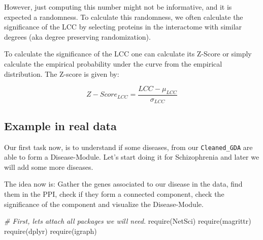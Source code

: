 \documentclass[
]{book}
\newenvironment{Shaded}{\begin{snugshade}}{\end{snugshade}}
\newcommand{\CommentTok}[1]{\textcolor[rgb]{0.56,0.35,0.01}{\textit{#1}}}
\newcommand{\FunctionTok}[1]{\textcolor[rgb]{0.00,0.00,0.00}{#1}}
\newcommand{\NormalTok}[1]{#1}
\begin{document}
However, just computing this number might not be informative, and it is expected a randomness. To calculate this randomness, we often calculate the significance of the LCC by selecting proteins in the interactome with similar degrees (aka degree preserving randomization).

To calculate the significance of the LCC one can calculate its Z-Score or simply calculate the empirical probability under the curve from the empirical distribution. The Z-score is given by:

\[
Z-Score_{LCC} = \frac{LCC - \mu_{LCC}}{\sigma_{LCC}}
\]

\hypertarget{example-in-real-data}{%
\subsection{Example in real data}\label{example-in-real-data}}

Our first task now, is to understand if some diseases, from our \texttt{Cleaned\_GDA} are able to form a Disease-Module. Let's start doing it for Schizophrenia and later we will add some more diseases.

The idea now is: Gather the genes associated to our disease in the data, find them in the PPI, check if they form a connected component, check the significance of the component and visualize the Disease-Module.

\begin{Shaded}
\begin{Highlighting}[]
\CommentTok{\# First, let\textquotesingle{}s attach all packages we will need.}
\FunctionTok{require}\NormalTok{(NetSci)}
\FunctionTok{require}\NormalTok{(magrittr)}
\FunctionTok{require}\NormalTok{(dplyr)}
\FunctionTok{require}\NormalTok{(igraph)}
\end{Highlighting}
\end{Shaded}
\end{document}
